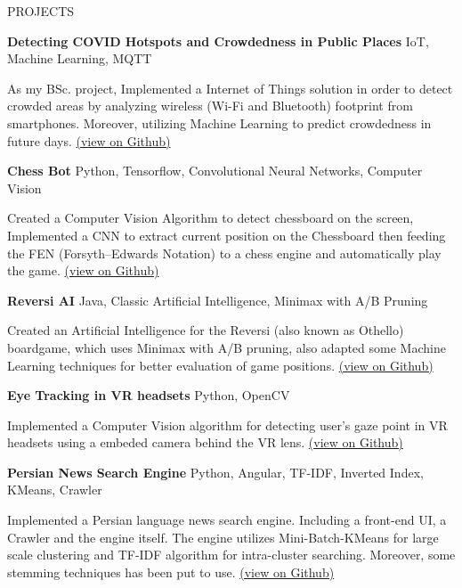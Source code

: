 \documentclass{resume} %
\begin{document}
\begin{rSection}{PROJECTS}
\vspace{-1.25em}


\item \textbf{Detecting COVID Hotspots and Crowdedness in Public Places} {IoT, Machine Learning, MQTT}
\begin{addmargin}[2em]{2em}
As my BSc. project, Implemented a Internet of Things solution in order to detect crowded areas by analyzing wireless (Wi-Fi and Bluetooth) footprint from smartphones. Moreover, utilizing Machine Learning to predict crowdedness in future days. \href{https://github.com/arminkz/crowdedness-detection}{(view on Github)}
\end{addmargin}


\item \textbf{Chess Bot} {Python, Tensorflow, Convolutional Neural Networks, Computer Vision}
\begin{addmargin}[2em]{2em}
Created a Computer Vision Algorithm to detect chessboard on the screen, Implemented a CNN to extract current position on the Chessboard then feeding the FEN (Forsyth–Edwards Notation) to a chess engine and automatically play the game. \href{https://github.com/arminkz/ChessBot}{(view on Github)}
\end{addmargin}


\item \textbf{Reversi AI}  {Java, Classic Artificial Intelligence, Minimax with A/B Pruning}
\begin{addmargin}[2em]{2em}
Created an Artificial Intelligence for the Reversi (also known as Othello) boardgame, which uses Minimax with A/B pruning, also adapted some Machine Learning techniques for better evaluation of game positions. \href{https://github.com/arminkz/Reversi}{(view on Github)}
\end{addmargin}

\item \textbf{Eye Tracking in VR headsets} {Python, OpenCV}
\begin{addmargin}[2em]{2em}
Implemented a Computer Vision algorithm for detecting user's gaze point in VR headsets using a embeded camera behind the VR lens. \href{https://github.com/arminkz/EyeTrackingVR}{(view on Github)}
\end{addmargin}


\item \textbf{Persian News Search Engine} {Python, Angular, TF-IDF, Inverted Index, KMeans, Crawler}
\begin{addmargin}[2em]{2em}
Implemented a Persian language news search engine. Including a front-end UI, a Crawler and the engine itself. The engine utilizes Mini-Batch-KMeans for large scale clustering and TF-IDF algorithm for intra-cluster searching. Moreover, some stemming techniques has been put to use.
\href{https://github.com/kianelbo/newsKAP}{(view on Github)}
\end{addmargin}


\end{rSection}
\end{document}
